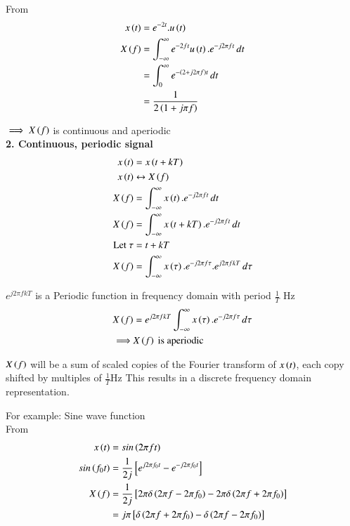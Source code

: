 \documentclass[journal,12pt,onecolumn]{IEEEtran}
\theoremstyle{remark}
\begin{document}
From 
\begin{align}
x\left(t\right)&=e^{-2 t}.u\left(t\right)\\
X\left(f\right)&= \int_{-\infty}^{\infty} e^{-2ft}u\left(t\right).e^{-j2\pi ft}\,dt\\
&= \int_{0}^{\infty} e^{-\left(2+j2\pi f\right)t}\,dt\\
&= \frac{1}{2\left(1 + j\pi f\right)}
\end{align}

$\implies X\left(f\right) $ is continuous and aperiodic \\
 

\textbf{2. Continuous, periodic signal}\\

\begin{align}
x\left(t\right)&=x\left(t+kT\right)\\
x\left(t\right)& \leftrightarrow X\left(f\right)\\
X\left(f\right)&=\int_{-\infty}^{\infty} x\left(t\right).e^{-j2\pi ft}\,dt\\
X\left(f\right)&=\int_{-\infty}^{\infty} x\left(t+kT\right).e^{-j2\pi ft}\,dt\\
\text{Let } \tau &= t+kT\\
X\left(f\right)&=\int_{-\infty}^{\infty} x\left(\tau\right).e^{-j2\pi f\tau}.e^{j2\pi fkT}\,d\tau
\end{align}

$e^{j2\pi fkT} $ is a Periodic function in frequency domain with period $\frac{1}{T}$ Hz \\
\begin{align}
X\left(f\right)&=e^{j2\pi fkT}\int_{-\infty}^{\infty} x\left(\tau\right).e^{-j2\pi f\tau}\,d\tau\\
\implies &X\left(f\right) \text{ is aperiodic}
\end{align}


$X\left(f\right)$ will be  a sum of scaled copies of the Fourier transform of $x\left(t\right)$, each copy shifted by multiples of $\frac{1}{T}$Hz This results in a discrete frequency domain representation.\\
\vspace{2mm}

For example: Sine wave function\\

From 
\begin{align}
x\left(t\right)&=sin\left(2\pi ft\right)\\
sin\left(f_0t\right)&= \frac{1}{2j}{}\left[e^{j2\pi f_0 t} -  e^{-j2\pi f_0 t} \right]\\
X\left(f\right) &=  \frac{1}{2j}  {}\left[2\pi \delta\left(2\pi f- 2\pi f_0\right) - 2\pi \delta\left(2\pi f+2\pi f_0\right)  \right]\\
&= j\pi {}\left[\delta\left(2\pi f + 2\pi f_0\right) -   \delta\left(2\pi f - 2\pi f_0\right)\right]
\end{align}
\end{document}
